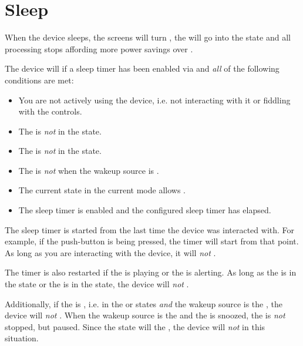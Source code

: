\section{Sleep} \label{Power - Sleep} 

When the device sleeps, the screens will turn , the  will go into
the  state and all processing stops affording more power savings over
.

\par\medskip

The device will  if a sleep timer has been enabled via
\hyperref[Power Settings]{} and \textit{all} of the following conditions
are met:

\begin{itemize}
  \item You are not actively using the device, i.e. not interacting with it or
    fiddling with the controls.
  \item The  is \textit{not} in the  state.
  \item The  is \textit{not} in the  state.
  \item The  is \textit{not}  when the wakeup source is .
  \item The current state in the current mode allows .
  \item The sleep timer is enabled and the configured sleep timer has elapsed.
\end{itemize}

The sleep timer is started from the last time the device was interacted with.
For example, if the  push-button is being pressed, the timer will start
from that point.  As long as you are interacting with the device, it will
\textit{not} .

\par\medskip

The timer is also restarted if the  is playing or the  is
alerting.  As long as the  is in the  state or the  is in
the  state, the device will \textit{not} .

\par\medskip

Additionally, if the  is , i.e. in the  or 
states \textit{and} the wakeup source is the , the device will
\textit{not} .  When the wakeup source is the  and the 
is snoozed, the  is \textit{not} stopped, but paused.  Since the
 state will  the , the device will \textit{not}
 in this situation.


